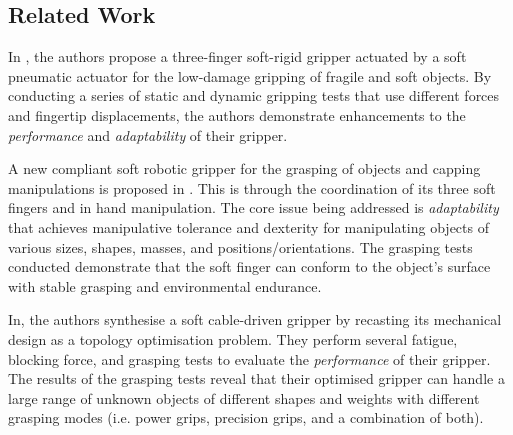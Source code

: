 \documentclass[lettersize,journal]{IEEEtran}
\begin{document}
%

\subsection{Related Work}\label{relatedwork}
In \cite{Cheng2021}, the authors propose a three-finger soft-rigid gripper actuated by a soft pneumatic actuator for the low-damage gripping of fragile and soft objects. 
By conducting a series of static and dynamic gripping tests that use different forces and fingertip displacements, the authors demonstrate enhancements to the \emph{performance} and \emph{adaptability} of their gripper.  %

A new compliant soft robotic gripper for the grasping of objects and capping manipulations is proposed in \cite{Liu2021}. This is through the coordination of its three soft fingers and in hand manipulation. 
The core issue being addressed is \emph{adaptability} that achieves manipulative tolerance and dexterity for manipulating objects of various sizes, shapes, masses, and positions/orientations. 
The grasping tests conducted demonstrate that the soft finger can conform to the object’s surface with stable grasping and environmental endurance. 

In\cite{Chen2018}, the authors synthesise a soft cable-driven gripper by recasting its mechanical design as a topology optimisation problem. 
They perform several fatigue, blocking force, and grasping tests to evaluate the \emph{performance} of their gripper.  
The results of the grasping tests reveal that their optimised gripper can handle a large range of unknown objects of different shapes and weights with different grasping modes (i.e. power grips, precision grips, and a combination of both).
\end{document}
